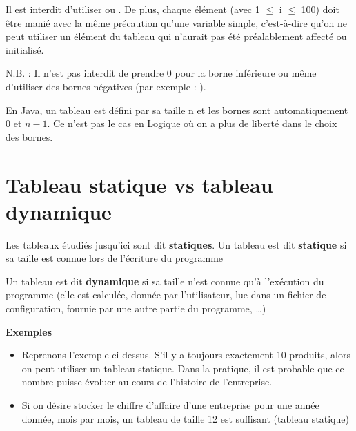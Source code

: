 	
	Il est interdit d’utiliser  ou
	. De plus, chaque élément
	 (avec 1 ${\leq}$ i ${\leq}$ 100) doit
	être manié avec la même précaution qu’une variable simple, c’est-à-dire
	qu’on ne peut utiliser un élément du tableau qui n’aurait pas été
	préalablement affecté ou initialisé.

	N.B. : Il n'est pas interdit de prendre 0 pour la borne
	inférieure ou même d'utiliser des bornes négatives
	(par exemple : ).

	En Java, un tableau est défini par sa taille n et les bornes sont
	automatiquement $0$ et $n-1$. Ce n'est pas le cas en
	Logique où on a plus de liberté dans le choix des bornes.

\section{Tableau statique vs tableau dynamique}

	Les tableaux étudiés jusqu'ici sont dit \textbf{statiques}.
	Un tableau est dit \textbf{statique} si sa taille 
	est connue lors de l’écriture du programme

	Un tableau est dit \textbf{dynamique}
	si sa taille n’est connue qu’à l’exécution du programme (elle est
	calculée, donnée par l’utilisateur, lue dans un fichier de
	configuration, fournie par une autre partie du programme, \dots)


	\textbf{Exemples}

	\begin{itemize}
	\item
		Reprenons l’exemple ci-dessus. 
		S’il y a toujours exactement 10 produits, 
		alors on peut utiliser un tableau statique. 
		Dans la pratique, il est probable que ce nombre puisse évoluer 
		au cours de l’histoire de l’entreprise.
	\item 
		Si on désire stocker le chiffre d’affaire d’une entreprise 
		pour une année donnée, mois par mois, un tableau de
		taille 12 est suffisant (tableau statique)
	\end{itemize}

